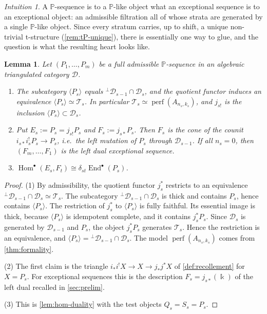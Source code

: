 \documentclass[11pt,reqno]{amsart}
\theoremstyle{plain}
\newtheorem{lemma}[theorem]{Lemma}
\theoremstyle{definition}
\theoremstyle{remark}
\newtheorem*{intuition}{Intuition}
\newcommand{\kk}{\Bbbk}
\DeclareMathOperator{\Hom}{Hom}
\DeclareMathOperator{\End}{End}
\newcommand{\thick}[1]{\langle #1\rangle}
\newcommand{\cD}{\mathcal{D}}
\newcommand{\cT}{\mathcal{T}}
\begin{document}
\begin{intuition}
A $\mathbb{P}$-sequence is to a $\mathbb{P}$-like object what an exceptional sequence is to an exceptional object: an admissible filtration all of whose strata are generated by a single $\mathbb{P}$-like object. Since every stratum carries, up to shift, a unique non-trivial t-structure (\cref{rem:tP-unique}), there is essentially one way to glue, and the question is what the resulting heart looks like.
\end{intuition}

\begin{lemma}\label{lem:P-strata}
Let $(P_1,\dots,P_m)$ be a full admissible $\mathbb{P}$-sequence in an algebraic triangulated category $\cD$.
\begin{enumerate}
\item The subcategory $\thick{P_s}$ equals ${}^\perp\cD_{s-1}\cap\cD_s$, and the quotient functor induces an equivalence $\thick{P_s}\simeq\cT_s$. In particular $\cT_s\simeq\operatorname{perf}(A_{n_s,k_s})$, and $j_{s!}$ is the inclusion $\thick{P_s}\subset\cD_s$.
\item Put $E_s:=P_s=j_{s!}P_s$ and $F_s:=j_{s*}P_s$. Then $F_s$ is the cone of the counit $i_{s*}i_s^!P_s\to P_s$, i.e.\ the left mutation of $P_s$ through $\cD_{s-1}$. If all $n_s=0$, then $(F_m,\dots,F_1)$ is the left dual exceptional sequence.
\item $\Hom^\bullet(E_s,F_t)\cong\delta_{st}\End^\bullet(P_s)$.
\end{enumerate}
\end{lemma}

\begin{proof}
(1) By admissibility, the quotient functor $j_s^*$ restricts to an equivalence ${}^\perp\cD_{s-1}\cap\cD_s\simeq\cT_s$. The subcategory ${}^\perp\cD_{s-1}\cap\cD_s$ is thick and contains $P_s$, hence contains $\thick{P_s}$. The restriction of $j_s^*$ to $\thick{P_s}$ is fully faithful. Its essential image is thick, because $\thick{P_s}$ is idempotent complete, and it contains $j_s^*P_s$. Since $\cD_s$ is generated by $\cD_{s-1}$ and $P_s$, the object $j_s^*P_s$ generates $\cT_s$. Hence the restriction is an equivalence, and $\thick{P_s}={}^\perp\cD_{s-1}\cap\cD_s$. The model $\operatorname{perf}(A_{n_s,k_s})$ comes from \cref{thm:formality}.

(2) The first claim is the triangle $i_*i^!X\to X\to j_*j^*X$ of \cref{def:recollement} for $X=P_s$. For exceptional sequences this is the description $F_s=j_{s*}(\kk)$ of the left dual recalled in \cref{sec:prelim}.

(3) This is \cref{lem:hom-duality} with the test objects $Q_s=S_s=P_s$.
\end{proof}
\end{document}
